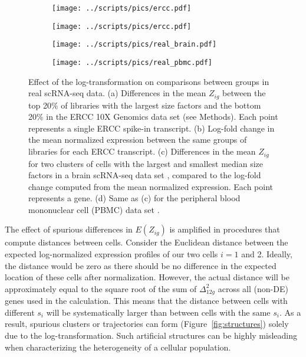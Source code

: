 \documentclass[10pt,letterpaper]{article}
\begin{document}
\begin{figure}
\centering
\begin{subfigure}[b]{0.49\textwidth}
    \texttt{[image: ../scripts/pics/ercc.pdf]}
    \caption{}
\end{subfigure}
\begin{subfigure}[b]{0.49\textwidth}
    \texttt{[image: ../scripts/pics/ercc.pdf]}
    \caption{}
\end{subfigure}
\begin{subfigure}[b]{0.49\textwidth}
    \texttt{[image: ../scripts/pics/real\_brain.pdf]}
    \caption{}
\end{subfigure}
\begin{subfigure}[b]{0.49\textwidth}
    \texttt{[image: ../scripts/pics/real\_pbmc.pdf]}
    \caption{}
\end{subfigure}
\caption{Effect of the log-transformation on comparisons between groups in real scRNA-seq data.
(a) Differences in the mean $Z_{ig}$ between the top 20\% of libraries with the largest size factors and the bottom 20\% in the ERCC 10X Genomics data set (see Methods).
Each point represents a single ERCC spike-in transcript.
(b) Log-fold change in the mean normalized expression between the same groups of libraries for each ERCC transcript.
(c) Differences in the mean $Z_{ig}$ for two clusters of cells with the largest and smallest median size factors in a brain scRNA-seq data set \cite{zeisel2015brain},
compared to the log-fold change computed from the mean normalized expression.
Each point represents a gene.
(d) Same as (c) for the peripheral blood mononuclear cell (PBMC) data set \cite{zheng2017massively}.
}

\label{fig:ercc}
\end{figure}

The effect of spurious differences in $E(Z_{ig})$ is amplified in procedures that compute distances between cells.
Consider the Euclidean distance between the expected log-normalized expression profiles of our two cells $i=1$ and 2.
Ideally, the distance would be zero as there should be no difference in the expected location of these cells after normalization.
However, the actual distance will be approximately equal to the square root of the sum of $\Delta_{12g}^2$ across all (non-DE) genes used in the calculation.
This means that the distance between cells with different $s_i$ will be systematically larger than between cells with the same $s_i$.
As a result, spurious clusters or trajectories can form (Figure~\ref{fig:structures}) solely due to the log-transformation.
Such artificial structures can be highly misleading when characterizing the heterogeneity of a cellular population.
\end{document}
